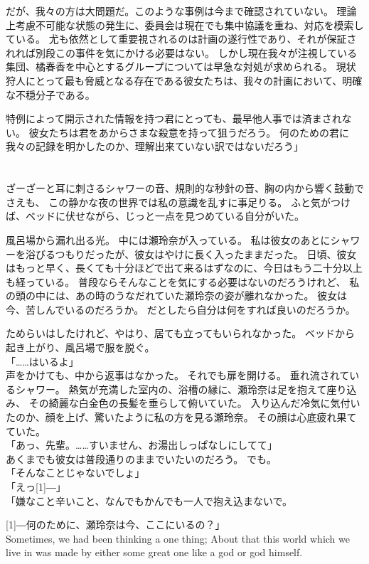 \documentclass[autodetect-engine,dvipdfmx-if-dvi,a5paper,ja=standard,twoside,titlepage,final,twocolumn]{ltjtbook}
\begin{document}
だが、我々の方は大問題だ。このような事例は今まで確認されていない。
理論上考慮不可能な状態の発生に、委員会は現在でも集中協議を重ね、対応を模索している。
尤も依然として重要視されるのは計画の遂行性であり、それが保証されれば別段この事件を気にかける必要はない。
しかし現在我々が注視している集団、橘春香を中心とするグループについては早急な対処が求められる。
現状狩人にとって最も脅威となる存在である彼女たちは、我々の計画において、明確な不穏分子である。

特例によって開示された情報を持つ君にとっても、最早他人事では済まされない。
彼女たちは君をあからさまな殺意を持って狙うだろう。
何のための君に我々の記録を明かしたのか、理解出来ていない訳ではないだろう」

\section{}
ざーざーと耳に刺さるシャワーの音、規則的な秒針の音、胸の内から響く鼓動でさえも、
この静かな夜の世界では私の意識を乱すに事足りる。
ふと気がつけば、ベッドに伏せながら、じっと一点を見つめている自分がいた。

風呂場から漏れ出る光。
中には瀬玲奈が入っている。
私は彼女のあとにシャワーを浴びるつもりだったが、彼女はやけに長く入ったままだった。
日頃、彼女はもっと早く、長くても十分ほどで出て来るはずなのに、今日はもう二十分以上も経っている。
普段ならそんなことを気にする必要はないのだろうけれど、
私の頭の中には、あの時のうなだれていた瀬玲奈の姿が離れなかった。
彼女は今、苦しんでいるのだろうか。
だとしたら自分は何をすれば良いのだろうか。

ためらいはしたけれど、やはり、居ても立ってもいられなかった。
ベッドから起き上がり、風呂場で服を脱ぐ。\\
「……はいるよ」\\
声をかけても、中から返事はなかった。
それでも扉を開ける。
垂れ流されているシャワー。
熱気が充満した室内の、浴槽の縁に、瀬玲奈は足を抱えて座り込み、
その綺麗な白金色の長髪を垂らして俯いていた。
入り込んだ冷気に気付いたのか、顔を上げ、驚いたように私の方を見る瀬玲奈。
その顔は心底疲れ果てていた。\\
「あっ、先輩。……すいません、お湯出しっぱなしにしてて」\\
あくまでも彼女は普段通りのままでいたいのだろう。
でも。\\
「そんなことじゃないでしょ」\\
「えっ\scalebox{3}[1]{―}」\\
「嫌なこと辛いこと、なんでもかんでも一人で抱え込まないで。

\scalebox{3}[1]{―}何のために、瀬玲奈は今、ここにいるの？」\\

Sometimes, we had been thinking a one thing; 
About that this world which we live in 
was made by either some great one like a god or god himself.
\end{document}
